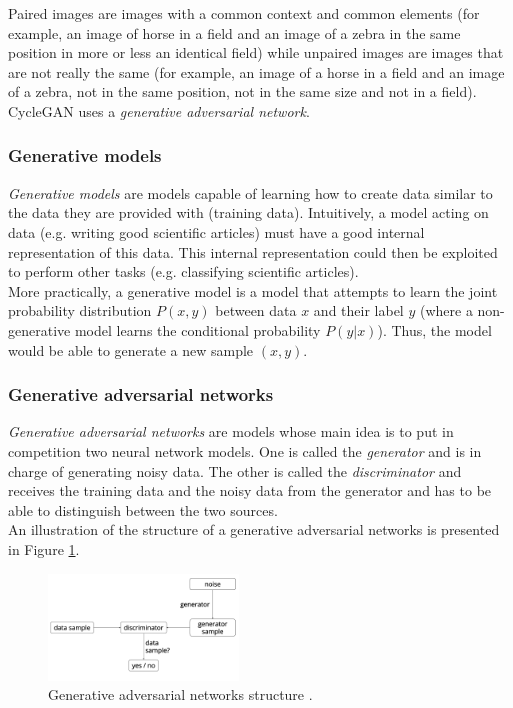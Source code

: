 \documentclass[twocolumn,superscriptaddress,aps, floatfix]{revtex4-1}
\begin{document}
    Paired images are images with a common context and common elements (for example, an image of horse in a field and an image of a zebra in the same position in more or less an identical field) while unpaired images are images that are not really the same (for example, an image of a horse in a field and an image of a zebra, not in the same position, not in the same size and not in a field).\\
    
    CycleGAN uses a \emph{generative adversarial network}.
    
    \subsubsection{Generative models}
    
    \emph{Generative models} are models capable of learning how to create data similar to the data they are provided with (training data). Intuitively, a model acting on data (e.g. writing good scientific articles) must have a good internal representation of this data. This internal representation could then be exploited to perform other tasks (e.g. classifying scientific articles).\\
    
    More practically, a generative model is a model that attempts to learn the joint probability distribution $P(x,y)$ between data $x$ and their label $y$ (where a non-generative model learns the conditional probability $P(y|x)$). Thus, the model would be able to generate a new sample $(x,y)$.
    
    \subsubsection{Generative adversarial networks}
    
    \emph{Generative adversarial networks} are models whose main idea is to put in competition two neural network models. One is called the \emph{generator} and is in charge of generating noisy data. The other is called the \emph{discriminator} and receives the training data and the noisy data from the generator and has to be able to distinguish between the two sources.\\
    
    An illustration of the structure of a generative adversarial networks is presented in Figure \ref{fig:methods.cyclegan.gan}.
    
    \begin{figure}[ht]
        \centering
        \includegraphics[width=0.45\textwidth]{resources/png/gan.png}
        \caption{Generative adversarial networks structure \cite{blog.aylien.com}.}
        \label{fig:methods.cyclegan.gan}
    \end{figure}
    
\end{document}
